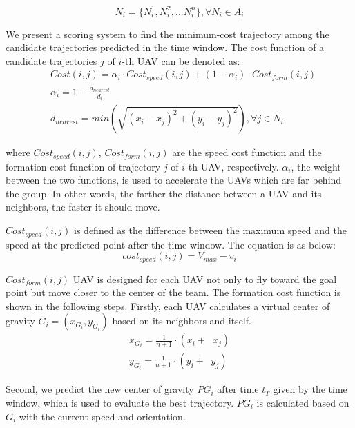 \begin{equation}
N_{i}=\{N_{i}^1, N_{i}^2, ...N_{i}^n\}, \forall N_{i}\in A_{i}
\end{equation}

We present a scoring system to find the minimum-cost trajectory among the candidate trajectories predicted in the time window. The cost function of a candidate trajectories $j$ of $i$-th UAV can be denoted as:
\begin{equation}
\begin{aligned}
& Cost(i, j) = \alpha_{i}\cdot Cost_{speed}(i, j) + (1-\alpha_{i})\cdot Cost_{form}(i, j) \\
& \alpha_{i} = 1 - \frac{d_{nearest}}{d_{i}} \\
& d_{nearest} = min (\sqrt{(x_{i}-x_{j})^2 + (y_{i}-y_{j})^2}), \forall j\in N_{i}
\end{aligned}
\end{equation}

where $Cost_{speed}(i, j)$, $Cost_{form}(i, j)$ are the speed cost function and the formation cost function of trajectory $j$ of $i$-th UAV, respectively. $\alpha_{i}$, the weight between the two functions, is used to accelerate the UAVs which are far behind the group. In other words, the farther the distance between a UAV and its neighbors, the faster it should move. 

$Cost_{speed}(i, j)$ is defined as the difference between the maximum speed and the speed at the predicted point after the time window. The equation is as below:
\begin{equation}
cost_{speed}(i, j) = V_{max} - v_{i}
\end{equation}

$Cost_{form}(i, j)$ UAV is designed for each UAV not only to fly toward the goal point but move closer to the center of the team. The formation cost function is shown in the following steps. Firstly, each UAV calculates a virtual center of gravity $G_{i} = (x_{G_{i}}, y_{G_{i}})$ based on its neighbors and itself. 
\begin{equation}
\begin{aligned}
x_{G_{i}} = \frac{1}{n+1}\cdot (x_{i}+\mathop{\sum_{j\in N_{i}}} x_{j})\\
y_{G_{i}} = \frac{1}{n+1}\cdot (y_{i}+\mathop{\sum_{j\in N_{i}}} y_{j})
\end{aligned}
\end{equation}

Second, we predict the new center of gravity $PG_{i}$  after time $t_{T}$ given by the time window, which is used to evaluate the best trajectory. $PG_{i}$ is calculated based on $G_{i}$ with the current speed and orientation.

